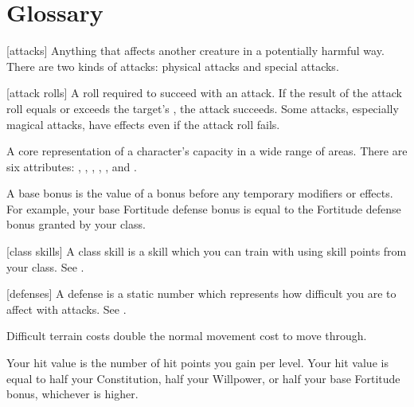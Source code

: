 \chapter{Glossary}\label{Glossary}

[attacks] Anything that affects another creature in a potentially harmful way. There are two kinds of attacks: physical attacks and special attacks.

[attack rolls] A roll required to succeed with an attack. If the result of the attack roll equals or exceeds the target's , the attack succeeds. Some attacks, especially magical attacks, have effects even if the attack roll fails.

 A core representation of a character's capacity in a wide range of areas. There are six attributes: , , , , , and .

 A base bonus is the value of a bonus before any temporary modifiers or effects. For example, your base Fortitude defense bonus is equal to the Fortitude defense bonus granted by your class.

[class skills] A class skill is a skill which you can train with using skill points from your class. See .

[defenses] A defense is a static number which represents how difficult you are to affect with attacks. See .

 Difficult terrain costs double the normal movement cost to move through.

 Your hit value is the number of hit points you gain per level. Your hit value is equal to half your Constitution, half your Willpower, or half your base Fortitude bonus, whichever is higher.
